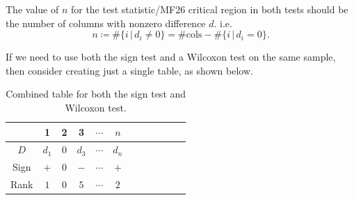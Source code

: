 \documentclass[../Notes.tex]{subfiles}
\begin{document}
\begin{note}\hypertarget{non-parametric-tests-n-value}{}
  The value of \(n\) for the test statistic/MF26 critical region in both tests should be the number of columns with nonzero difference \(d\). i.e.
  \[n\coloneq\#\{i \,\vert\, d_i\neq 0\}=\#\text{cols}-\#\{i \,\vert\, d_i=0\}.\]
\end{note}
\begin{note}
  If we need to use both the sign test and a Wilcoxon test on the same sample, then consider creating just a single table, as shown below. 
  \begin{table}[H]
    \centering
    \begin{tabular}{|Sc|Sc|Sc|Sc|Sc|Sc|}
       & 1 & 2 & 3 & \(\cdots\) & \(n\)\\
      \hline 
      \(D\) & \(d_1\) & \(0\) & \(d_3\) & \(\cdots\) & \(d_n\)\\
      \hline
      Sign & \(+\) & \(0\) & \(-\) & \(\cdots\) & \(+\)\\
      \hline
      Rank & \(1\) & \(0\) & \(5\) & \(\cdots\) & \(2\)\\
      \hline
    \end{tabular}
    \caption{Combined table for both the sign test and Wilcoxon test.}
    \label{table:sign-Wilcoxon-combined}
  \end{table}
\end{note}
\end{document}
